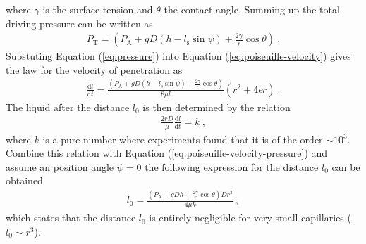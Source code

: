 \documentclass[aip, amsmath, amssymb, reprint, twocolumn, floatfix]{revtex4-1}
\newcommand{\dldt}{\frac{\mathrm{d}l}{\mathrm{d}t}}
\newcommand{\Pa}{P_\mathrm{A}}
\newcommand{\Pt}{P_\mathrm{T}}
\newcommand{\ls}{l_\mathrm{s}}
\begin{document}
where $\gamma$ is the surface tension and $\theta$ the contact angle. Summing up the total driving pressure can be written as
\begin{gather}
	\Pt = \left(\Pa + gD (h - \ls \sin \psi) + \frac{2\gamma}{r}\cos \theta\right)~.
	\label{eq:pressure}
\end{gather}
Substuting Equation (\ref{eq:pressure}) into Equation (\ref{eq:poiseuille-velocity}) gives the law for the velocity of penetration as 
\begin{gather}
	\dldt = \frac{\left(\Pa + gD (h - \ls \sin \psi) + \frac{2\gamma}{r}\cos \theta\right)}{8\mu l}\left(r^2 + 4\epsilon r \right)~.
	\label{eq:poiseuille-velocity-pressure}
\end{gather}
The liquid after the distance $l_0$ is then determined by the relation
\begin{gather}
	\frac{2rD}{\mu}\dldt = k~,
	\label{eq:osbourne-reynolds}
\end{gather}
where $k$ is a pure number where experiments found that it is of the order $\sim 10^3$. Combine this relation with Equation (\ref{eq:poiseuille-velocity-pressure}) and assume an position angle $\psi = 0$ the following expression for the distance $l_0$ can be obtained 
\begin{gather}
	l_0 = \frac{\left(\Pa + gDh + \frac{2\gamma}{r}\cos \theta\right) D r^3}{4\mu k}~,
\end{gather}
which states that the distance $l_0$ is entirely negligible for very small capillaries ($l_0 \sim r^3$). 
\bigskip
\end{document}
